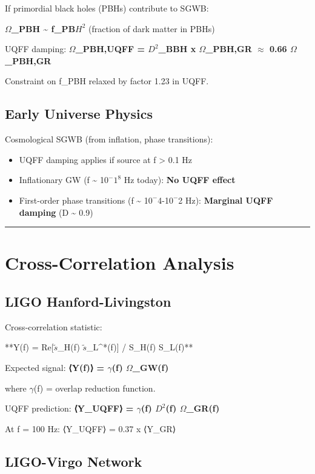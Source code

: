 \documentclass[12pt,a4paper]{article}
\begin{document}
If primordial black holes (PBHs) contribute to SGWB:

\textbf{$\Omega$\_PBH \textasciitilde{}  f\_PB$H^{2}$} (fraction of dark matter in PBHs)

UQFF damping: \textbf{$\Omega$\_PBH,UQFF = $D^{2}$\_BBH x $\Omega$\_PBH,GR $\approx$ 0.66 $\Omega$\_PBH,GR}

Constraint on f\_PBH relaxed by factor 1.23 in UQFF.

\subsection{Early Universe Physics}

Cosmological SGWB (from inflation, phase transitions):

\begin{itemize}
  \item UQFF damping applies if source at f > 0.1 Hz
  \item Inflationary GW (f \textasciitilde{} 1$0^{-}$$1^{8}$ Hz today): \textbf{No UQFF effect}
  \item First-order phase transitions (f \textasciitilde{} 1$0^{-}$4-1$0^{-}$2 Hz): \textbf{Marginal UQFF damping} (D \textasciitilde{} 0.9)
\end{itemize}

\medskip\hrule\medskip

\section{Cross-Correlation Analysis}

\subsection{LIGO Hanford-Livingston}

Cross-correlation statistic:

**Y(f) = Re[$\tilde{s}$\_H(f) $\tilde{s}$\_L\^{}*(f)] / S\_H(f) S\_L(f)**

Expected signal: \textbf{⟨Y(f)⟩ = $\gamma$(f) $\Omega$\_GW(f)}

where $\gamma$(f) = overlap reduction function.

UQFF prediction: \textbf{⟨Y\_UQFF⟩ = $\gamma$(f) $D^{2}$(f) $\Omega$\_GR(f)}

At f = 100 Hz: ⟨Y\_UQFF⟩ = 0.37 x ⟨Y\_GR⟩

\subsection{LIGO-Virgo Network}
\end{document}
